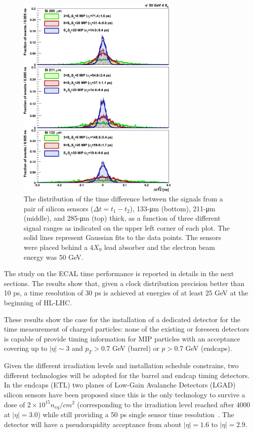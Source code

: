\begin{figure}[h!]
  \centering
  \includegraphics[width = 0.7\textwidth]{figures/upgrade/hgcal_timing.png}
  \caption{The distribution of the time difference between the signals from a pair of silicon sensors ($\Delta t = t_1 - t_2$),
    133-μm (bottom), 211-μm (middle), and 285-μm (top) thick,
    as a function of three different signal ranges as indicated on the upper left corner of each plot.
    The solid lines represent Gaussian fits to the data points.
    The sensors were placed behind a $4X_9$ lead absorber and the electron beam energy was 50 GeV.~\cite{hgcal_time_tb}}
  \label{fig:hgcal_time_res}
\end{figure}
  
The study on the ECAL time performance is reported in details in the next sections. The results show that,
given a clock distribution precision better than 10 ps, a time resolution of 30 ps is achieved at energies
of at least 25 GeV at the beginning of HL-LHC.

These results show the case for the installation of a dedicated detector for the time measurement of charged particles:
none of the existing or foreseen detectors is capable of provide timing information for MIP particles with an
acceptance covering up to $|\eta|\sim 3$ and $p_T > 0.7$ GeV (barrel) or $p > 0.7$ GeV (endcaps).

Given the different irradiation levels and installation schedule constrains, two different
technologies will be adopted for the barrel and endcap timing detectors. In the endcaps (ETL) two planes of
Low-Gain Avalanche Detectors (LGAD) silicon sensors have been proposed since this is the only technology
to survive a dose of $2\times 10^{15} n_{eq}/cm^2$ 
(corresponding to the irradiation level reached after 4000 \fbinv at $|\eta|=3.0$)
while still providing a 50 ps single sensor time resolution~\cite{lgad1, lgad2}. The detector will have
a pseudorapidity acceptance from about $|\eta| = 1.6$ to $|\eta| = 2.9$.


